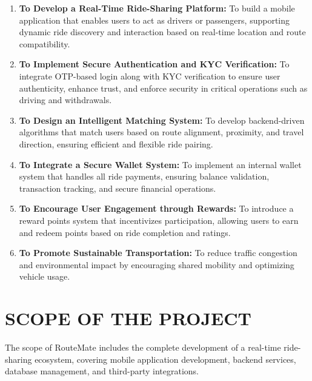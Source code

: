 \documentclass[10pt,a4paper]{report}
\begin{document}
\begin{enumerate}
    \item \textbf{To Develop a Real-Time Ride-Sharing Platform:} To build a mobile application that enables users to act as drivers or passengers, supporting dynamic ride discovery and interaction based on real-time location and route compatibility.

    \item \textbf{To Implement Secure Authentication and KYC Verification:} To integrate OTP-based login along with KYC verification to ensure user authenticity, enhance trust, and enforce security in critical operations such as driving and withdrawals.

    \item \textbf{To Design an Intelligent Matching System:} To develop backend-driven algorithms that match users based on route alignment, proximity, and travel direction, ensuring efficient and flexible ride pairing.

    \item \textbf{To Integrate a Secure Wallet System:} To implement an internal wallet system that handles all ride payments, ensuring balance validation, transaction tracking, and secure financial operations.

    \item \textbf{To Encourage User Engagement through Rewards:} To introduce a reward points system that incentivizes participation, allowing users to earn and redeem points based on ride completion and ratings.

    \item \textbf{To Promote Sustainable Transportation:} To reduce traffic congestion and environmental impact by encouraging shared mobility and optimizing vehicle usage.
\end{enumerate}

\section{\textbf{SCOPE OF THE PROJECT}}
\large\justify
The scope of RouteMate includes the complete development of a real-time ride-sharing ecosystem, covering mobile application development, backend services, database management, and third-party integrations.
\end{document}
